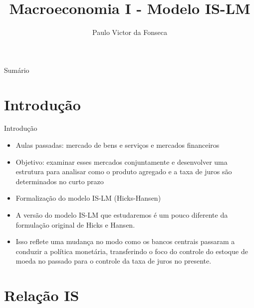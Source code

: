 \documentclass[10pt]{beamer}
\title[]{Macroeconomia I - Modelo IS-LM}
\author[]{Paulo Victor da Fonseca}
\date{}
\begin{document}
\begin{frame}[plain]
\end{frame}

\begin{frame}{Sumário}
    \tableofcontents
\end{frame}

\section{Introdução}
\begin{frame}{Introdução}
    \begin{itemize}
        \item Aulas passadas: mercado de bens e serviços e mercados financeiros
        \bigskip
        \item Objetivo: examinar esses mercados conjuntamente e desenvolver uma estrutura para analisar como o produto agregado e a taxa de juros são determinados no curto prazo
        \bigskip
        \item Formalização do modelo IS-LM (Hicks-Hansen)
        \bigskip
        \item A versão do modelo IS-LM que estudaremos é um pouco diferente da formulação original de Hicks e Hansen.
        \bigskip
        \item Isso reflete uma mudança no modo como os bancos centrais passaram a conduzir a política monetária, transferindo o foco do controle do estoque de moeda no passado para o controle da taxa de juros no presente.
    \end{itemize}
\end{frame}

\section{Relação IS}
\end{document}
